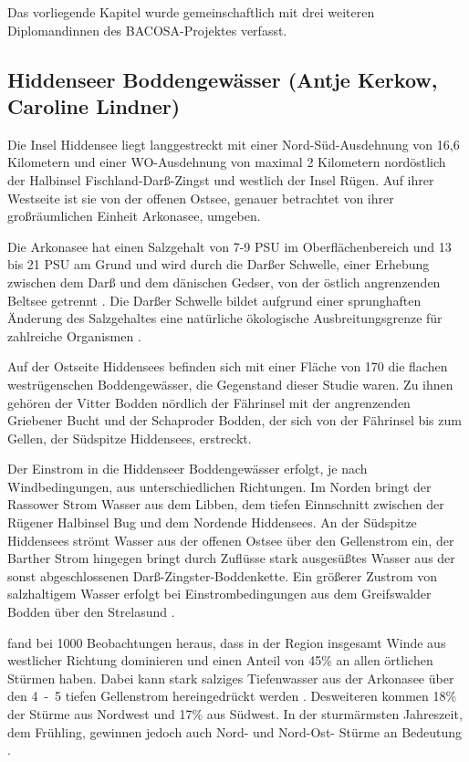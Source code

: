 Das vorliegende Kapitel wurde gemeinschaftlich mit drei weiteren Diplomandinnen des BACOSA-Projektes verfasst.  

\subsection{Hiddenseer Boddengewässer (Antje Kerkow, Caroline Lindner)}

Die Insel Hiddensee liegt langgestreckt mit einer Nord-Süd-Ausdehnung von 16,6 Kilometern und einer WO-Ausdehnung von maximal 2 Kilometern nordöstlich der Halbinsel Fischland-Darß-Zingst und westlich der Insel Rügen. Auf ihrer Westseite ist sie von der offenen Ostsee, genauer betrachtet von ihrer großräumlichen Einheit Arkonasee, umgeben.

Die Arkonasee hat einen Salzgehalt von 7-9 PSU im Oberflächenbereich und 13 bis 21 PSU am Grund \citep{iow_2014} und wird durch die Darßer Schwelle, einer Erhebung zwischen dem Darß und dem dänischen Gedser, von der östlich angrenzenden Beltsee getrennt \citep{biele_1997}. Die Darßer Schwelle bildet aufgrund einer sprunghaften Änderung des Salzgehaltes eine natürliche ökologische Ausbreitungsgrenze für zahlreiche Organismen \citep{biele_1997}.

Auf der Ostseite Hiddensees befinden sich mit einer Fläche von \unit{170}{\kilo\metre\squared} die flachen westrügenschen Boddengewässer, die Gegenstand dieser Studie waren. Zu ihnen gehören der Vitter Bodden nördlich der Fährinsel mit der angrenzenden Griebener Bucht und der Schaproder Bodden, der sich von der Fährinsel bis zum Gellen, der Südspitze Hiddensees, erstreckt.

Der Einstrom in die Hiddenseer Boddengewässer erfolgt, je nach Windbedingungen, aus unterschiedlichen Richtungen. Im Norden bringt der Rassower Strom Wasser aus dem Libben, dem tiefen Einnschnitt zwischen der Rügener Halbinsel Bug und dem Nordende Hiddensees. An der Südspitze Hiddensees strömt Wasser aus der offenen Ostsee über den Gellenstrom ein, der Barther Strom hingegen bringt durch Zuflüsse stark ausgesüßtes Wasser aus der sonst abgeschlossenen Darß-Zingster-Boddenkette. Ein größerer Zustrom von salzhaltigem Wasser erfolgt bei Einstrombedingungen aus dem Greifswalder Bodden über den Strelasund \citep{leps_1933}.

\cite{hartnack_1926} fand bei 1000 Beobachtungen heraus, dass in der Region insgesamt Winde aus westlicher Richtung dominieren und einen Anteil von \unit{45}{\%} an allen örtlichen Stürmen haben. Dabei kann stark salziges Tiefenwasser aus der Arkonasee über den \unit{4-5}{\metre} tiefen Gellenstrom hereingedrückt werden \citep{leps_1933}. Desweiteren kommen \unit{18}{\%} der Stürme aus Nordwest und \unit{17}{\%} aus Südwest. In der sturmärmsten Jahreszeit, dem Frühling, gewinnen jedoch auch Nord- und Nord-Ost- Stürme an Bedeutung \citep{hartnack_1926}.

